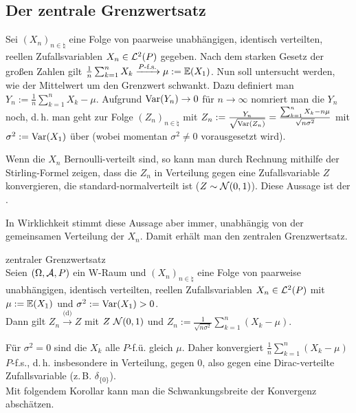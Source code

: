 \pagebreak

\subsection{%
    Der zentrale Grenzwertsatz%
}

\begin{Bem}
    Sei $(X_n)_{n \in \natural}$ eine Folge von paarweise unabhängigen,
    identisch verteilten, reellen Zufallsvariablen $X_n \in \mathcal{L}^2(P)$ gegeben.
    Nach dem starken Gesetz der großen Zahlen gilt
    $\frac{1}{n} \sum_{k=1}^n X_k \xrightarrow{P\text{-f.s.}} \mu := \mathbb{E}(X_1)$.
    Nun soll untersucht werden, wie der Mittelwert um den Grenzwert schwankt.
    Dazu definiert man $Y_n := \frac{1}{n} \sum_{k=1}^n X_k - \mu$.
    Aufgrund $\text{Var}(Y_n) \to 0$ für $n \to \infty$ nomriert man die $Y_n$ noch,
    d.\,h. man geht zur Folge $(Z_n)_{n \in \natural}$ mit
    $Z_n := \frac{Y_n}{\sqrt{\text{Var}(Z_n)}} = \frac{\sum_{k=1}^n X_k - n \mu}
    {\sqrt{n \sigma^2}}$ mit $\sigma^2 := \text{Var}(X_1)$ über
    (wobei momentan $\sigma^2 \not= 0$ vorausgesetzt wird).
    
    Wenn die $X_n$ Bernoulli-verteilt sind, so kann man durch Rechnung mithilfe der Stirling-Formel
    zeigen, dass die $Z_n$ in Verteilung gegen eine Zufallsvariable $Z$ konvergieren,
    die standard-normalverteilt ist ($Z \sim \mathcal{N}(0, 1)$).
    Diese Aussage ist der .
    
    In Wirklichkeit stimmt diese Aussage aber immer, unabhängig von der gemeinsamen Verteilung
    der $X_n$.
    Damit erhält man den zentralen Grenzwertsatz.
\end{Bem}

\linie

\begin{Satz}{zentraler Grenzwertsatz}\\
    Seien $(\Omega, \mathcal{A}, P)$ ein W-Raum und $(X_n)_{n \in \natural}$
    eine Folge von paarweise unabhängigen, identisch verteilten,
    reellen Zufallsvariablen $X_n \in \mathcal{L}^2(P)$ mit $\mu := \mathbb{E}(X_1)$ und
    $\sigma^2 := \text{Var}(X_1) > 0$.\\
    Dann gilt $Z_n \xrightarrow{\text{(d)}} Z$ mit $Z ~ \mathcal{N}(0, 1)$ und
    $Z_n := \frac{1}{\sqrt{n \sigma^2}} \sum_{k=1}^n (X_k - \mu)$.
\end{Satz}

\begin{Bem}
    Für $\sigma^2 = 0$ sind die $X_k$ alle $P$-f.ü. gleich $\mu$.
    Daher konvergiert $\frac{1}{n} \sum_{k=1}^n (X_k - \mu)$ $P$-f.s., d.\,h.
    insbesondere in Verteilung, gegen $0$,
    also gegen eine Dirac-verteilte Zufallsvariable (z.\,B. $\delta_{\{0\}}$).\\
    Mit folgendem Korollar kann man die Schwankungsbreite der Konvergenz abschätzen.
\end{Bem}

